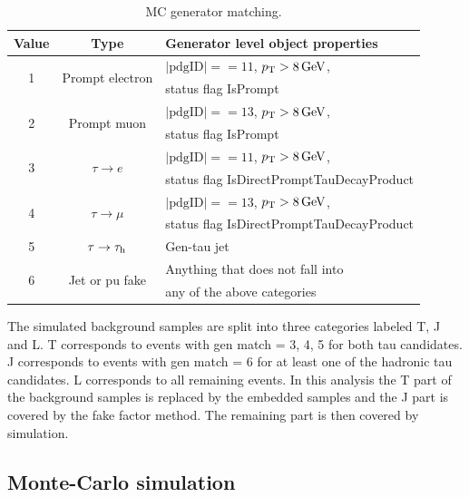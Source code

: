 \begin{table}[]
    \centering
    \caption{MC generator matching.}
    \begin{tabular}{|c|c|l|}
        \hline
        Value & Type & Generator level object properties \\
        \hline
        \multirow{2}{*}{1} & \multirow{2}{*}{Prompt electron} & $|\mathrm{pdgID}|==11$, $p_{\mathrm{T}} > 8 \,\mathrm{GeV}$,\\
         & &  status flag IsPrompt \\
        \hline
        \multirow{2}{*}{2} & \multirow{2}{*}{Prompt muon} & $|\mathrm{pdgID}|==13$, $p_{\mathrm{T}} > 8 \,\mathrm{GeV}$, \\
         & & status flag IsPrompt \\
        \hline
        \multirow{2}{*}{3} & \multirow{2}{*}{$\tau \rightarrow e$} & $|\mathrm{pdgID}|==11$, $p_{\mathrm{T}} > 8 \,\mathrm{GeV}$,\\
         & &  status flag IsDirectPromptTauDecayProduct \\
        \hline
        \multirow{2}{*}{4} & \multirow{2}{*}{$\tau \rightarrow \mu$} & $|\mathrm{pdgID}|==13$, $p_{\mathrm{T}} > 8 \,\mathrm{GeV}$, \\
         & & status flag IsDirectPromptTauDecayProduct \\
        \hline
        \multirow{2}{*}{5} & \multirow{2}{*}{$\tau \rightarrow \tau_{\rm h}$} & \multirow{2}{*}{Gen-tau jet} \\
         & & \\
        \hline
        \multirow{2}{*}{6} & \multirow{2}{*}{Jet or pu fake}  & Anything that does not fall into \\
         & &  any of the above categories \\
        \hline
    \end{tabular}
    \label{tab:mc_matching}
\end{table}

The simulated background samples are split into three categories labeled T, J and L. T corresponds to events with gen match = 3, 4, 5 for both tau candidates. J corresponds to events with gen match = 6 for at least one of the hadronic tau candidates. L corresponds to all remaining events. In this analysis the T part of the background samples is replaced by the embedded samples and the J part is covered by the fake factor method. The remaining part is then covered by simulation.


\subsection{Monte-Carlo simulation}
\label{sec:MC_corr}

